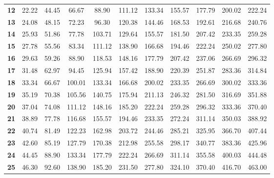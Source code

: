 \begin{table}[h]
\begin{tabular}{c|cccccccccc}
\textbf{12}      & 22.22      & 44.45      & 66.67      & 88.90      & 111.12     & 133.34     & 155.57     & 177.79     & 200.02     & 222.24      \\
\textbf{13}      & 24.08      & 48.15      & 72.23      & 96.30      & 120.38     & 144.46     & 168.53     & 192.61     & 216.68     & 240.76      \\
\textbf{14}      & 25.93      & 51.86      & 77.78      & 103.71     & 129.64     & 155.57     & 181.50     & 207.42     & 233.35     & 259.28      \\
\textbf{15}      & 27.78      & 55.56      & 83.34      & 111.12     & 138.90     & 166.68     & 194.46     & 222.24     & 250.02     & 277.80      \\
\textbf{16}      & 29.63      & 59.26      & 88.90      & 118.53     & 148.16     & 177.79     & 207.42     & 237.06     & 266.69     & 296.32      \\
\textbf{17}      & 31.48      & 62.97      & 94.45      & 125.94     & 157.42     & 188.90     & 220.39     & 251.87     & 283.36     & 314.84      \\
\textbf{18}      & 33.34      & 66.67      & 100.01     & 133.34     & 166.68     & 200.02     & 233.35     & 266.69     & 300.02     & 333.36      \\
\textbf{19}      & 35.19      & 70.38      & 105.56     & 140.75     & 175.94     & 211.13     & 246.32     & 281.50     & 316.69     & 351.88      \\
\textbf{20}      & 37.04      & 74.08      & 111.12     & 148.16     & 185.20     & 222.24     & 259.28     & 296.32     & 333.36     & 370.40      \\
\textbf{21}      & 38.89      & 77.78      & 116.68     & 155.57     & 194.46     & 233.35     & 272.24     & 311.14     & 350.03     & 388.92      \\
\textbf{22}      & 40.74      & 81.49      & 122.23     & 162.98     & 203.72     & 244.46     & 285.21     & 325.95     & 366.70     & 407.44      \\
\textbf{23}      & 42.60      & 85.19      & 127.79     & 170.38     & 212.98     & 255.58     & 298.17     & 340.77     & 383.36     & 425.96      \\
\textbf{24}      & 44.45      & 88.90      & 133.34     & 177.79     & 222.24     & 266.69     & 311.14     & 355.58     & 400.03     & 444.48      \\
\textbf{25}      & 46.30      & 92.60      & 138.90     & 185.20     & 231.50     & 277.80     & 324.10     & 370.40     & 416.70     & 463.00      \\

\end{tabular}
\end{table}
